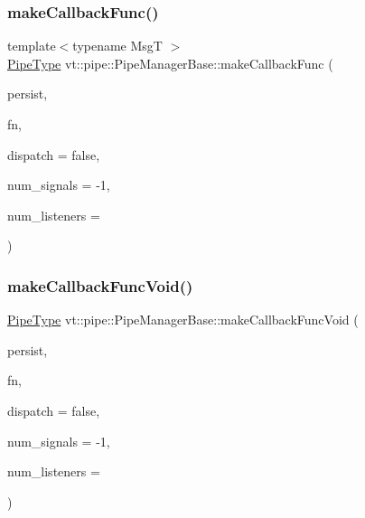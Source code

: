 \subsubsection{\texorpdfstring{make\+Callback\+Func()}{makeCallbackFunc()}}
{\footnotesize\ttfamily template$<$typename MsgT $>$ \\
\hyperlink{namespacevt_ac9852acda74d1896f48f406cd72c7bd3}{Pipe\+Type} vt\+::pipe\+::\+Pipe\+Manager\+Base\+::make\+Callback\+Func (\begin{DoxyParamCaption}\item[{bool const \&}]{persist,  }\item[{\hyperlink{structvt_1_1pipe_1_1_pipe_manager_base_aa54eee64ab32a27777a672d49eb861f4}{Func\+Msg\+Type}$<$ MsgT $>$}]{fn,  }\item[{bool const \&}]{dispatch = {\ttfamily false},  }\item[{\hyperlink{namespacevt_ace18d74dd489d9ea506d38789fffce34}{Pipe\+Ref\+Type}}]{num\+\_\+signals = {\ttfamily -\/1},  }\item[{\hyperlink{namespacevt_ace18d74dd489d9ea506d38789fffce34}{Pipe\+Ref\+Type}}]{num\+\_\+listeners = {} }\end{DoxyParamCaption})}

\mbox{\label{structvt_1_1pipe_1_1_pipe_manager_base_a06e2f38ea4dc340ccc63b0c695df3951}} 
\subsubsection{\texorpdfstring{make\+Callback\+Func\+Void()}{makeCallbackFuncVoid()}}
{\footnotesize\ttfamily \hyperlink{namespacevt_ac9852acda74d1896f48f406cd72c7bd3}{Pipe\+Type} vt\+::pipe\+::\+Pipe\+Manager\+Base\+::make\+Callback\+Func\+Void (\begin{DoxyParamCaption}\item[{bool const \&}]{persist,  }\item[{\hyperlink{structvt_1_1pipe_1_1_pipe_manager_base_a7ddc75a14fa50cd8521641ef6f9ea78d}{Func\+Type}}]{fn,  }\item[{bool const \&}]{dispatch = {\ttfamily false},  }\item[{\hyperlink{namespacevt_ace18d74dd489d9ea506d38789fffce34}{Pipe\+Ref\+Type}}]{num\+\_\+signals = {\ttfamily -\/1},  }\item[{\hyperlink{namespacevt_ace18d74dd489d9ea506d38789fffce34}{Pipe\+Ref\+Type}}]{num\+\_\+listeners = {} }\end{DoxyParamCaption})}


